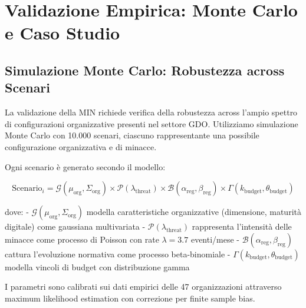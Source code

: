 \section{Validazione Empirica: Monte Carlo e Caso Studio}

\subsection{Simulazione Monte Carlo: Robustezza across Scenari}

La validazione della MIN richiede verifica della robustezza across l'ampio spettro di configurazioni organizzative presenti nel settore GDO. Utilizziamo simulazione Monte Carlo con 10.000 scenari, ciascuno rappresentante una possibile configurazione organizzativa e di minacce.

Ogni scenario è generato secondo il modello:

\begin{equation}
\text{Scenario}_i = \mathcal{G}(\mu_{\text{org}}, \Sigma_{\text{org}}) \times \mathcal{P}(\lambda_{\text{threat}}) \times \mathcal{B}(\alpha_{\text{reg}}, \beta_{\text{reg}}) \times \Gamma(k_{\text{budget}}, \theta_{\text{budget}})
\label{eq:scenario_generation}
\end{equation}

dove:
- $\mathcal{G}(\mu_{\text{org}}, \Sigma_{\text{org}})$ modella caratteristiche organizzative (dimensione, maturità digitale) come gaussiana multivariata
- $\mathcal{P}(\lambda_{\text{threat}})$ rappresenta l'intensità delle minacce come processo di Poisson con rate $\lambda = 3.7$ eventi/mese
- $\mathcal{B}(\alpha_{\text{reg}}, \beta_{\text{reg}})$ cattura l'evoluzione normativa come processo beta-binomiale
- $\Gamma(k_{\text{budget}}, \theta_{\text{budget}})$ modella vincoli di budget con distribuzione gamma

I parametri sono calibrati sui dati empirici delle 47 organizzazioni attraverso maximum likelihood estimation con correzione per finite sample bias.

